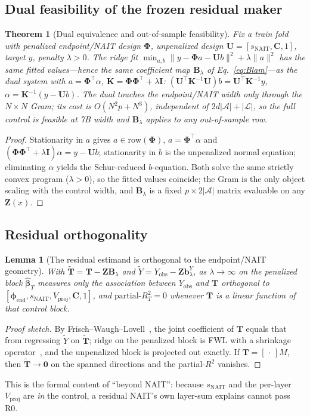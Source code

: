 \documentclass[11pt]{article}
\newtheorem{theorem}{Theorem}
\newtheorem{lemma}{Lemma}
\theoremstyle{definition}
\newcommand{\phend}{\bm{\phi}_{\mathrm{end}}}
\newcommand{\Tmat}{\mathbf{T}}
\newcommand{\Ttil}{\widetilde{\mathbf{T}}}
\newcommand{\Zmat}{\mathbf{Z}}
\newcommand{\Blam}{\mathbf{B}_{\lambda}}
\newcommand{\Aset}{\mathcal{A}}
\newcommand{\Lset}{\mathcal{L}}
\begin{document}
\subsection{Dual feasibility of the frozen residual maker}
\begin{theorem}[Dual equivalence and out-of-sample feasibility]
\label{thm:dual}
Fix a train fold with penalized endpoint/NAIT design $\bm\Phi$, unpenalized design
$\mathbf U=[s_{\mathrm{NAIT}},\mathbf C,1]$, target $y$, penalty $\lambda>0$. The ridge fit
$\min_{a,b}\lVert y-\bm\Phi a-\mathbf U b\rVert^2+\lambda\lVert a\rVert^2$ has the same
fitted values---hence the same coefficient map $\Blam$ of Eq.~\eqref{eq:Blam}---as the dual
system with $a=\bm\Phi^\top\alpha$, $\mathbf K=\bm\Phi\bm\Phi^\top+\lambda\mathbf I$:
$(\mathbf U^\top\mathbf K^{-1}\mathbf U)b=\mathbf U^\top\mathbf K^{-1}y$,
$\alpha=\mathbf K^{-1}(y-\mathbf U b)$. The dual touches the endpoint/NAIT width only
through the $N\times N$ Gram; its cost is $O(N^2p+N^3)$, independent of $2d|\Aset|+|\Lset|$,
so the full control is feasible at 7B width and $\Blam$ applies to any out-of-sample row.
\end{theorem}
\begin{proof}
Stationarity in $a$ gives $a\in\mathrm{row}(\bm\Phi)$, $a=\bm\Phi^\top\alpha$ and
$(\bm\Phi\bm\Phi^\top+\lambda\mathbf I)\alpha=y-\mathbf U b$; stationarity in $b$ is the
unpenalized normal equation; eliminating $\alpha$ yields the Schur-reduced $b$-equation.
Both solve the same strictly convex program ($\lambda>0$), so the fitted values coincide;
the Gram is the only object scaling with the control width, and $\Blam$ is a fixed
$p\times2|\Aset|$ matrix evaluable on any $\Zmat(x)$.
\end{proof}

\subsection{Residual orthogonality}
\begin{lemma}[The residual estimand is orthogonal to the endpoint/NAIT geometry]
\label{lem:resid}
With $\Ttil=\Tmat-\Zmat\Blam$ and $\widetilde Y=Y_{\mathrm{obs}}-\Zmat\mathbf b_\lambda^{Y}$,
as $\lambda\to\infty$ on the penalized block $\hat{\bm\beta}_T$ measures only the
association between $Y_{\mathrm{obs}}$ and $\Tmat$ orthogonal to
$[\phend,s_{\mathrm{NAIT}},V_{\mathrm{proj}},\mathbf C,1]$, and
$\mathrm{partial\text{-}}R^2_T=0$ whenever $\Tmat$ is a linear function of that control
block.
\end{lemma}
\begin{proof}[Proof sketch]
By Frisch--Waugh--Lovell~\cite{frisch1933partial,lovell1963seasonal}, the joint coefficient
of $\Tmat$ equals that from regressing $\widetilde Y$ on $\Ttil$; ridge on the penalized
block is FWL with a shrinkage operator~\cite{hoerl1970ridge}, and the unpenalized block is
projected out exactly. If $\Tmat=[\,\cdot\,]M$, then $\Ttil\to\mathbf0$ on the spanned
directions and the partial-$R^2$ vanishes.
\end{proof}
\noindent This is the formal content of ``beyond NAIT'': because $s_{\mathrm{NAIT}}$ and the
per-layer $V_{\mathrm{proj}}$ are \emph{in} the control, a residual NAIT's own layer-sum
explains cannot pass R0.
\end{document}

